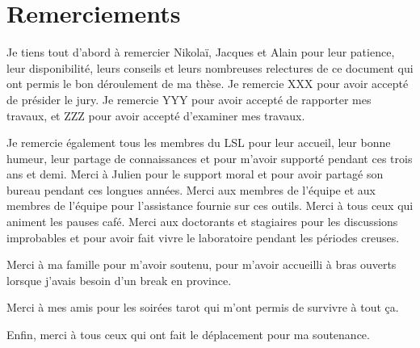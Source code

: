 \documentclass[french]{spimufcphdthesis}
\begin{document}
\chapter*{Remerciements}


Je tiens tout d'abord à remercier Nikola\"i, Jacques et Alain pour leur
patience, leur disponibilité, leurs conseils et leurs nombreuses relectures de
ce document qui ont permis le bon déroulement de ma thèse.
Je remercie XXX pour avoir accepté de présider le jury.
Je remercie YYY pour avoir accepté de rapporter mes travaux, et ZZZ pour avoir
accepté d'examiner mes travaux.

Je remercie également tous les membres du LSL pour leur accueil, leur bonne
humeur, leur partage de connaissances et pour m'avoir supporté pendant ces trois
ans et demi.
Merci à Julien pour le support moral et pour avoir partagé son bureau
pendant ces longues années.
Merci aux membres de l'équipe \framac et aux membres de l'équipe \pathcrawler
pour l'assistance fournie sur ces outils.
Merci à tous ceux qui animent les pauses café.
Merci aux doctorants et stagiaires pour les discussions improbables et pour
avoir fait vivre le laboratoire pendant les périodes creuses.

Merci à ma famille pour m'avoir soutenu, pour m'avoir accueilli à bras ouverts
lorsque j'avais besoin d'un break en province.

Merci à mes amis pour les soirées tarot qui m'ont permis de survivre à tout ça.

Enfin, merci à tous ceux qui ont fait le déplacement pour ma soutenance.


\tableofcontents
\mainmatter














\end{document}
